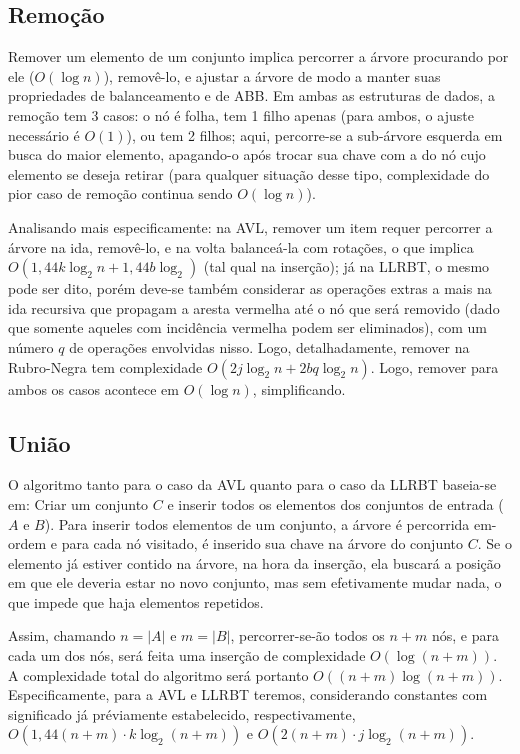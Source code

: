 \documentclass{article}
\begin{document}
\subsection{Remoção}
Remover um elemento de um conjunto implica percorrer a árvore procurando por ele ($O(\log n)$), removê-lo, e ajustar a árvore de modo a 
manter suas propriedades de balanceamento e de ABB. Em ambas as estruturas de dados, a remoção tem 3 casos: o nó é folha, tem 1
filho apenas (para ambos, o ajuste necessário é $O(1)$), ou tem 2 filhos; aqui, percorre-se a sub-árvore esquerda em busca do 
maior elemento, apagando-o após trocar sua chave com a do nó cujo elemento se deseja retirar (para qualquer situação desse tipo,
complexidade do pior caso de remoção continua sendo $O(\log n)$). 

Analisando mais especificamente: na AVL, remover um item requer percorrer a árvore na ida, removê-lo, e na volta balanceá-la com
rotações, o que implica $O(1,44 k \log_2 n + 1,44 b \log_2 )$ (tal qual na inserção); já na LLRBT, o mesmo pode ser dito, porém deve-se
também considerar as operações extras a mais na ida recursiva que propagam a aresta vermelha até o nó que será removido (dado que
somente aqueles com incidência vermelha podem ser eliminados), com um número $q$ de operações envolvidas nisso. Logo, detalhadamente,
remover na Rubro-Negra tem complexidade $O(2 j \log_2 n + 2 bq \log_2 n)$.
Logo, remover para ambos os casos acontece em $O(\log n)$, simplificando.

\subsection{União}
O algoritmo tanto para o caso da AVL quanto para o caso da LLRBT baseia-se em:
Criar um conjunto $C$ e inserir todos os elementos dos conjuntos de entrada ($A$ e $B$). Para inserir todos elementos de um
conjunto, a árvore é percorrida em-ordem e para cada nó visitado, é inserido sua chave na árvore do conjunto $C$. Se o elemento já 
estiver contido na árvore, na hora da inserção, ela buscará a posição em que ele deveria estar no novo conjunto, mas sem efetivamente
mudar nada, o que impede que haja elementos repetidos.

Assim, chamando $n = |A|$ e $m = |B|$, percorrer-se-ão todos os $n+m$ nós, e para cada um dos nós, será feita uma inserção
de complexidade $O(\log(n+m))$. A complexidade total do algoritmo será portanto $O((n+m)\log(n+m))$. Especificamente, para a 
AVL e LLRBT teremos, considerando constantes com significado já préviamente estabelecido, respectivamente, 
$O(1,44 (n+m) \cdot k\log_2(n+m))$ e $O(2 (n+m)\cdot j\log_2(n+m))$.
\end{document}
